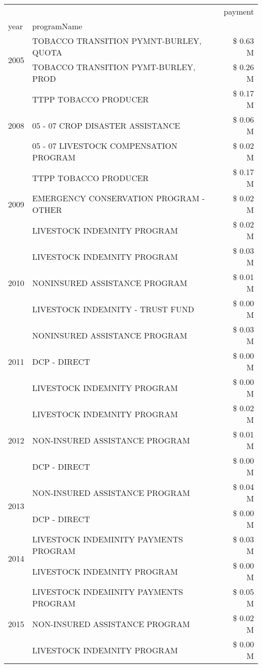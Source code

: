 \begin{tabular}{llr}
\toprule
 &  & payment \\
year & programName &  \\
\midrule
\multirow[t]{2}{*}{2005} & TOBACCO TRANSITION PYMNT-BURLEY, QUOTA & \$ 0.63 M \\
 & TOBACCO TRANSITION PYMT-BURLEY, PROD & \$ 0.26 M \\
\cline{1-3}
\multirow[t]{3}{*}{2008} & TTPP TOBACCO PRODUCER & \$ 0.17 M \\
 & 05 - 07 CROP DISASTER ASSISTANCE & \$ 0.06 M \\
 & 05 - 07 LIVESTOCK COMPENSATION PROGRAM & \$ 0.02 M \\
\cline{1-3}
\multirow[t]{3}{*}{2009} & TTPP TOBACCO PRODUCER & \$ 0.17 M \\
 & EMERGENCY CONSERVATION PROGRAM - OTHER & \$ 0.02 M \\
 & LIVESTOCK INDEMNITY PROGRAM & \$ 0.02 M \\
\cline{1-3}
\multirow[t]{3}{*}{2010} & LIVESTOCK INDEMNITY PROGRAM & \$ 0.03 M \\
 & NONINSURED ASSISTANCE PROGRAM & \$ 0.01 M \\
 & LIVESTOCK INDEMNITY - TRUST FUND & \$ 0.00 M \\
\cline{1-3}
\multirow[t]{3}{*}{2011} & NONINSURED ASSISTANCE PROGRAM & \$ 0.03 M \\
 & DCP - DIRECT & \$ 0.00 M \\
 & LIVESTOCK INDEMNITY PROGRAM & \$ 0.00 M \\
\cline{1-3}
\multirow[t]{3}{*}{2012} & LIVESTOCK INDEMNITY PROGRAM & \$ 0.02 M \\
 & NON-INSURED ASSISTANCE PROGRAM & \$ 0.01 M \\
 & DCP - DIRECT & \$ 0.00 M \\
\cline{1-3}
\multirow[t]{2}{*}{2013} & NON-INSURED ASSISTANCE PROGRAM & \$ 0.04 M \\
 & DCP - DIRECT & \$ 0.00 M \\
\cline{1-3}
\multirow[t]{2}{*}{2014} & LIVESTOCK INDEMINITY PAYMENTS PROGRAM & \$ 0.03 M \\
 & LIVESTOCK INDEMNITY PROGRAM & \$ 0.00 M \\
\cline{1-3}
\multirow[t]{3}{*}{2015} & LIVESTOCK INDEMINITY PAYMENTS PROGRAM & \$ 0.05 M \\
 & NON-INSURED ASSISTANCE PROGRAM & \$ 0.02 M \\
 & LIVESTOCK INDEMNITY PROGRAM & \$ 0.00 M \\

\end{tabular}
